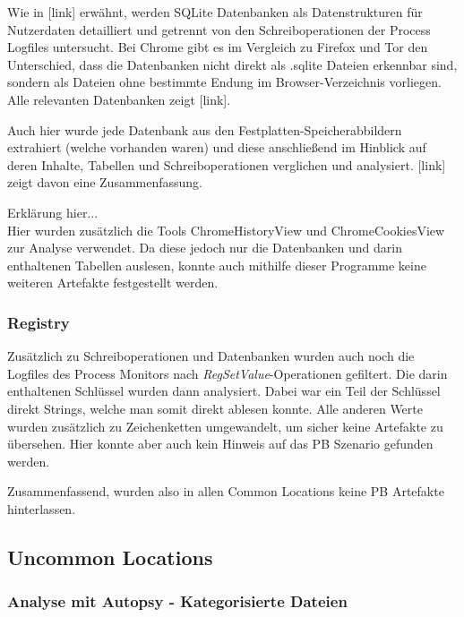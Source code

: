 \begin{appendices}
Wie in [link] erwähnt, werden SQLite Datenbanken als Datenstrukturen für Nutzerdaten
detailliert und getrennt von den Schreiboperationen der Process Logfiles untersucht. Bei Chrome gibt es im Vergleich zu Firefox und Tor den Unterschied, dass die Datenbanken nicht direkt als .sqlite Dateien erkennbar sind, sondern als Dateien ohne bestimmte Endung im Browser-Verzeichnis vorliegen. Alle relevanten Datenbanken zeigt [link].


Auch hier wurde jede Datenbank aus den Festplatten-Speicherabbildern extrahiert (welche vorhanden waren) und diese anschließend im Hinblick auf deren Inhalte, Tabellen und Schreiboperationen verglichen und analysiert. [link] zeigt davon eine Zusammenfassung.


Erklärung hier...\\
Hier wurden zusätzlich die Tools \glqq{}ChromeHistoryView\grqq{} und \glqq{}ChromeCookiesView\grqq{} zur Analyse verwendet. Da diese jedoch nur die Datenbanken und darin enthaltenen Tabellen auslesen, konnte auch mithilfe dieser Programme keine weiteren Artefakte festgestellt werden.

\subsubsection*{Registry}

Zusätzlich zu Schreiboperationen und Datenbanken wurden auch noch die Logfiles des Process Monitors nach \textit{RegSetValue}-Operationen gefiltert. Die darin enthaltenen Schlüssel wurden dann analysiert. Dabei war ein Teil der Schlüssel direkt Strings, welche man somit direkt ablesen konnte. Alle anderen Werte wurden zusätzlich zu Zeichenketten umgewandelt, um sicher keine Artefakte zu übersehen. Hier konnte aber auch kein Hinweis auf das PB Szenario gefunden werden. 

Zusammenfassend, wurden also in allen Common Locations keine PB Artefakte hinterlassen.

\subsection*{Uncommon Locations}

\subsubsection*{Analyse mit Autopsy - Kategorisierte Dateien}


\end{appendices}
